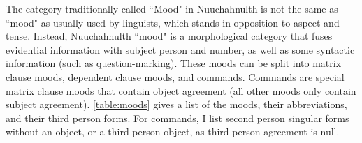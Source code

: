 The category traditionally called ``Mood" in Nuuchahnulth is not the same as ``mood" as usually used by linguists, which stands in opposition to aspect and tense. Instead, Nuuchahnulth ``mood" is a morphological category that fuses evidential information with subject person and number, as well as some syntactic information (such as question-marking). These moods can be split into matrix clause moods, dependent clause moods, and commands. Commands are special matrix clause moods that contain object agreement (all other moods only contain subject agreement). \cref{table:moods} gives a list of the moods, their abbreviations, and their third person forms. For commands, I list second person singular forms without an object, or a third person object, as third person agreement is null.


